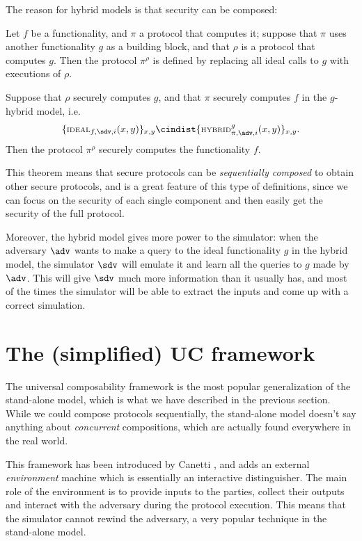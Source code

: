 The reason for hybrid models is that security can be composed: 
\begin{theorem}
    Let $f$ be a functionality, and $\pi$ a protocol that computes it; suppose that $\pi$ uses another functionality $g$ as a building block, and that $\rho$ is a protocol that computes $g$. Then the protocol $\pi^\rho$ is defined by replacing all ideal calls to $g$ with executions of $\rho$.
    
    Suppose that $\rho$ securely computes $g$, and that $\pi$ securely computes $f$ in the $g$-hybrid model, i.e.
    $$ \{ \textsc{\scriptsize IDEAL}_{f,\sdv,i}(x,y) \}_{x,y} \cindist \{ \textsc{\scriptsize HYBRID}^g_{\pi,\adv,i}(x,y) \}_{x,y}. $$
    Then the protocol $\pi^\rho$ securely computes the functionality $f$.
\end{theorem}

This theorem means that secure protocols can be \emph{sequentially composed} to obtain other secure protocols, and is a great feature of this type of definitions, since we can focus on the security of each single component and then easily get the security of the full protocol.

Moreover, the hybrid model gives more power to the simulator: when the adversary $\adv$ wants to make a query to the ideal functionality $g$ in the hybrid model, the simulator $\sdv$ will emulate it and learn all the queries to $g$ made by $\adv$. This will give $\sdv$ much more information than it usually has, and most of the times the simulator will be able to extract the inputs and come up with a correct simulation.

\section{The (simplified) UC framework}\label{section_SUC}
The universal composability framework is the most popular generalization of the stand-alone model, which is what we have described in the previous section. While we could compose protocols sequentially, the stand-alone model doesn't say anything about \emph{concurrent} compositions, which are actually found everywhere in the real world.

This framework has been introduced by Canetti \cite{Canetti_UC}, and adds an external \emph{environment} machine which is essentially an interactive distinguisher. The main role of the environment is to provide inputs to the parties, collect their outputs and interact with the adversary during the protocol execution. This means that the simulator cannot rewind the adversary, a very popular technique in the stand-alone model.

